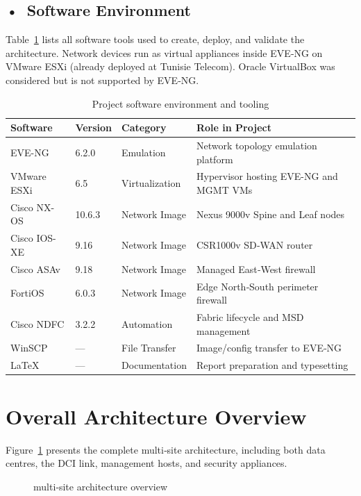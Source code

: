 \subsection*{\mbox{•}~Software Environment}
Table~\ref{tab:software-environment} lists all software tools used to create, deploy, and validate the architecture. Network devices run as virtual appliances inside EVE‑NG on VMware ESXi (already deployed at Tunisie Telecom). Oracle VirtualBox was considered but is not supported by EVE‑NG.

\begin{table}[!htbp]
\centering
\small
\renewcommand{\arraystretch}{1}
\setlength{\tabcolsep}{0.45em}
\begin{tabularx}{\textwidth}{@{}l l l X@{}}
\toprule
\textbf{Software} & \textbf{Version} & \textbf{Category} & \textbf{Role in Project} \\ \midrule
EVE-NG & 6.2.0 & Emulation & Network topology emulation platform \\
VMware ESXi & 6.5 & Virtualization & Hypervisor hosting EVE-NG and MGMT VMs \\
Cisco NX-OS & 10.6.3 & Network Image & Nexus 9000v Spine and Leaf nodes \\
Cisco IOS-XE & 9.16 & Network Image & CSR1000v SD‑WAN router \\
Cisco ASAv & 9.18 & Network Image & Managed East‑West firewall \\
FortiOS & 6.0.3 & Network Image & Edge North‑South perimeter firewall \\
Cisco NDFC & 3.2.2 & Automation & Fabric lifecycle and MSD management \\
WinSCP & — & File Transfer & Image/config transfer to EVE‑NG \\
\LaTeX & — & Documentation & Report preparation and typesetting \\ \bottomrule
\end{tabularx}
\caption{Project software environment and tooling}
\label{tab:software-environment}
\end{table}

\section{Overall Architecture Overview}
Figure~\ref{fig:overall-architecture} presents the complete multi‑site architecture, including both data centres, the DCI link, management hosts, and security appliances.

\begin{figure}[h]
    \centering
    \ArchitectureTopology
    \caption{multi‑site architecture overview}
    \label{fig:overall-architecture}
\end{figure}

